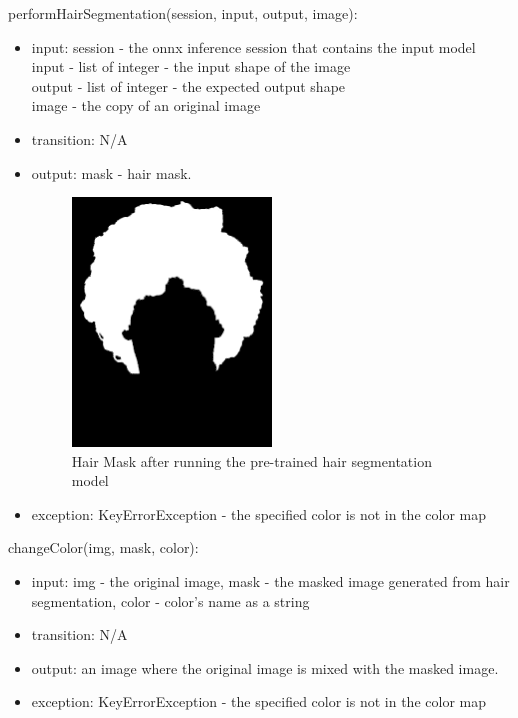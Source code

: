 \documentclass[12pt, titlepage]{article}
\begin{document}
\noindent performHairSegmentation(session, input, output, image):
\begin{itemize}
\item input: session  - the onnx inference session that contains the input model\\
input - list of integer - the input shape of the image\\
output - list of integer - the expected output shape\\
image - the copy of an original image
\item transition: N/A
\item output: mask - hair mask.
\begin{center}
\begin{figure}[H]
\includegraphics[width=0.5\textwidth]{Design/SoftDetailedDes/hair_mask.png}
\caption{Hair Mask after running the pre-trained hair segmentation model}
\label{Fig_UseHierarchy} 
\end{figure}
\end{center}
\item exception: KeyErrorException - the specified color is not in the color map
\end{itemize}

 \noindent changeColor(img, mask, color):
\begin{itemize}
\item input: img - the original image, mask - the masked image generated from hair segmentation, color - color's name as a string
\item transition: N/A
\item output: an image where the original image is mixed with the masked image.
\item exception: KeyErrorException - the specified color is not in the color map
\end{itemize}
\end{document}
